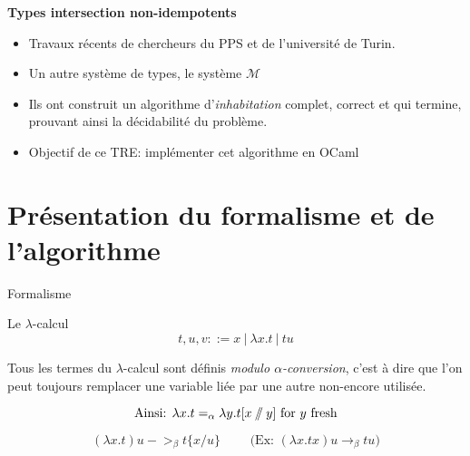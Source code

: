 \documentclass{beamer}
\newcommand\heading[1]{%
  \par\bigskip
  {\Large\bfseries#1}\par\smallskip}
\newcommand{\sslash}{\mathbin{/\mkern-6mu/}}
\begin{document}
    \begin{frame}
    \heading{Types intersection non-idempotents}
    \begin{itemize}
        \item Travaux récents de chercheurs du PPS et de l'université de Turin.
        \item Un autre système de types, le système $\mathcal{M}$
        \item Ils ont construit un algorithme d'\emph{inhabitation} complet, correct et qui termine, prouvant ainsi la décidabilité du problème.
        \item Objectif de ce TRE: implémenter cet algorithme en OCaml
    \end{itemize}
    \end{frame}
    
    
    \section{Présentation du formalisme et de l'algorithme}
    \begin{frame}{Formalisme}
        \begin{block}{Le $\lambda$-calcul}
        \vspace{-.3cm}
           \begin{equation*}
           t, u, v ::= x\ |\ \lambda x.t\ |\ tu 
           \end{equation*}	
        \end{block}
        
        \begin{definition}
            Tous les termes du $\lambda$-calcul sont définis \emph{modulo $\alpha$-conversion}, c'est à dire que l'on peut toujours remplacer une variable liée par une autre non-encore utilisée.
            
            \begin{equation*}
            \text{Ainsi: } \lambda x.t =_\alpha \lambda y.t[x\sslash y] \text{ for $y$ fresh}
            \end{equation*}
        \end{definition}
        \begin{definition}
            \vspace{-.3cm}
            \begin{equation*}
              (\lambda x.t) u ->_\beta t\{x/u\} \qquad\text{ (Ex: $(\lambda x.tx)u \rightarrow_\beta tu$)}
            \end{equation*}
        \end{definition}
    \end{frame}
\end{document}
